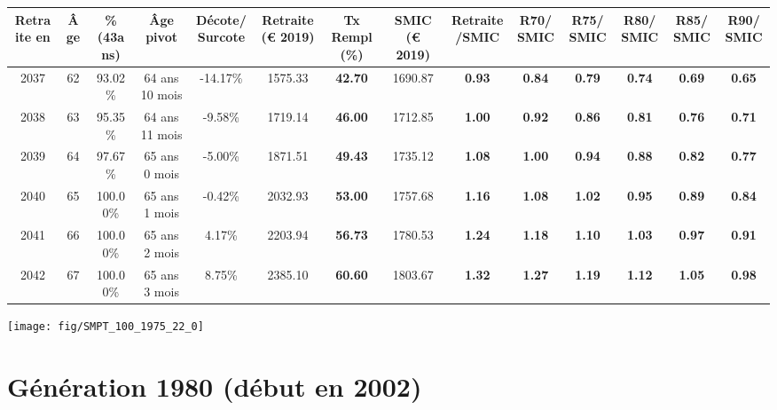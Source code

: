 \begin{adjustbox}{max width=\textwidth} 
\begin{tabular}[htb]{|c|c||c|c|c||c|c||c|c||c|c|c|c|c|} 
\hline 
 Retraite en &  Âge &  \%(43ans) &  Âge pivot &  Décote/Surcote &  Retraite (\euro{} 2019) &  Tx Rempl(\%) &  SMIC (\euro{} 2019) &  Retraite/SMIC &  R70/SMIC &  R75/SMIC &  R80/SMIC &  R85/SMIC &  R90/SMIC \\ 
\hline \hline 
 2037 &  62 &  93.02\% &  64 ans 10 mois &  -14.17\% &  1575.33 &  {\bf 42.70} &  1690.87 &  {\bf {\color{red} 0.93}} &  {\bf {\color{red} 0.84}} &  {\bf {\color{red} 0.79}} &  {\bf {\color{red} 0.74}} &  {\bf {\color{red} 0.69}} &  {\bf {\color{red} 0.65}} \\ 
\hline 
 2038 &  63 &  95.35\% &  64 ans 11 mois &  -9.58\% &  1719.14 &  {\bf 46.00} &  1712.85 &  {\bf 1.00} &  {\bf {\color{red} 0.92}} &  {\bf {\color{red} 0.86}} &  {\bf {\color{red} 0.81}} &  {\bf {\color{red} 0.76}} &  {\bf {\color{red} 0.71}} \\ 
\hline 
 2039 &  64 &  97.67\% &  65 ans 0 mois &  -5.00\% &  1871.51 &  {\bf 49.43} &  1735.12 &  {\bf 1.08} &  {\bf {\color{red} 1.00}} &  {\bf {\color{red} 0.94}} &  {\bf {\color{red} 0.88}} &  {\bf {\color{red} 0.82}} &  {\bf {\color{red} 0.77}} \\ 
\hline 
 2040 &  65 &  100.00\% &  65 ans 1 mois &  -0.42\% &  2032.93 &  {\bf 53.00} &  1757.68 &  {\bf 1.16} &  {\bf 1.08} &  {\bf 1.02} &  {\bf {\color{red} 0.95}} &  {\bf {\color{red} 0.89}} &  {\bf {\color{red} 0.84}} \\ 
\hline 
 2041 &  66 &  100.00\% &  65 ans 2 mois &  4.17\% &  2203.94 &  {\bf 56.73} &  1780.53 &  {\bf 1.24} &  {\bf 1.18} &  {\bf 1.10} &  {\bf 1.03} &  {\bf {\color{red} 0.97}} &  {\bf {\color{red} 0.91}} \\ 
\hline 
 2042 &  67 &  100.00\% &  65 ans 3 mois &  8.75\% &  2385.10 &  {\bf 60.60} &  1803.67 &  {\bf 1.32} &  {\bf 1.27} &  {\bf 1.19} &  {\bf 1.12} &  {\bf 1.05} &  {\bf {\color{red} 0.98}} \\ 
\hline 
\hline 
\end{tabular} 
\end{adjustbox} 
 
 \vspace{0.1cm} 

 {\hspace{-2.2cm}\texttt{[image: fig/SMPT\_100\_1975\_22\_0]}} 

\newpage 
 
\section{Génération 1980 (début en 2002)\label{SMPT_100_1980_22_0}} 
 
